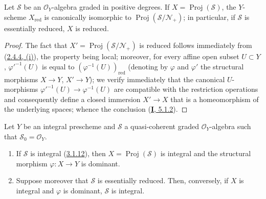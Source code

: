 \begin{proposition}[3.1.13]
\label{II.3.1.13}
Let $\mathcal{S}$ be an $\mathcal{O}_Y$-algebra graded in positive degrees.
If $X=\operatorname{Proj}(\mathcal{S})$, the $Y$-scheme $X_{\mathrm{red}}$ is
canonically isomorphic to $\operatorname{Proj}(\mathcal{S}/\mathcal{N}_+)$;
in particular, if $\mathcal{S}$ is essentially reduced, $X$ is reduced.
\end{proposition}

\begin{proof}
The fact that $X'=\operatorname{Proj}(\mathcal{S}/\mathcal{N}_+)$ is reduced
follows immediately from (\hyperref[II.2.4.4]{2.4.4, (i)}), the property
being local; moreover, for every affine open subset $U\subset Y$,
${\varphi'}^{-1}(U)$ is equal to $(\varphi^{-1}(U))_{\mathrm{red}}$ (denoting
by $\varphi$ and $\varphi'$ the structural morphisms $X\to Y$,
$X'\to Y$); we verify immediately that the canonical $U$-morphisms
${\varphi'}^{-1}(U)\to\varphi^{-1}(U)$ are compatible with the restriction
operations and consequently define a closed immersion $X'\to X$ that is a
homeomorphism of the underlying spaces; whence the conclusion
(\hyperref[I.5.1.2]{\textbf{I}, 5.1.2}).
\end{proof}

\begin{proposition}[3.1.14]
\label{II.3.1.14}
Let $Y$ be an integral prescheme and $\mathcal{S}$ a quasi-coherent graded
$\mathcal{O}_Y$-algebra such that $\mathcal{S}_0=\mathcal{O}_Y$.
\begin{enumerate}
  \item[\rm(i)] If $\mathcal{S}$ is integral
    \textup{(\hyperref[II.3.1.12]{3.1.12})}, then
    $X=\operatorname{Proj}(\mathcal{S})$ is integral and the structural
    morphism $\varphi:X\to Y$ is dominant.
  \item[\rm(ii)] Suppose moreover that $\mathcal{S}$ is essentially reduced.
    Then, conversely, if $X$ is integral and $\varphi$ is dominant,
    $\mathcal{S}$ is integral.
\end{enumerate}
\end{proposition}

